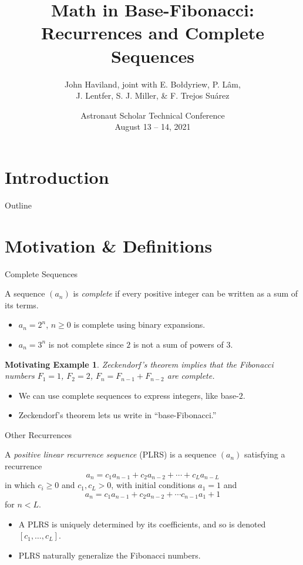 \documentclass[handout]{beamer}
\title[Recurrences and Completeness]{Math in Base-Fibonacci: Recurrences and Complete Sequences}
\author[J. Haviland]{
	John Haviland, joint with
	E. Bo\l dyriew,
	P. L\^am,\\
	J. Lentfer,
	S. J. Miller,
	\& F. Trejos Su\'arez
}
\institute[2021]{SMALL REU 2020, Williams College}
\date{
	Astronaut Scholar Technical Conference\\
	August 13 -- 14, 2021
}
\theoremstyle{example}
\newtheorem{motivexa}{Motivating Example}
\begin{document}
\section{Introduction}
\begin{frame}
	\titlepage
\end{frame}

\begin{frame}{Outline}
	\tableofcontents
\end{frame}

\section{Motivation \& Definitions}
\begin{frame}{Complete Sequences}
	\begin{definition}
		A sequence $(a_n)$ is \emph{complete} if every positive integer can be written as a sum of its terms.
	\end{definition}
	
	\pause
	\begin{itemize}\setlength{\itemsep}{1.5ex}
		\item $a_n = 2^n$, $n \geq 0$ is complete using binary expansions.
		\item $a_n = 3^n$ is not complete since $2$ is not a sum of powers of $3$.
	\end{itemize}
	
	\pause
	\begin{motivexa}
		\emph{Zeckendorf's theorem} implies that the Fibonacci numbers $F_1 = 1$, $F_2 = 2$, $F_n = F_{n - 1} + F_{n - 2}$ are complete.
	\end{motivexa}
	
	\pause
	\begin{itemize}\setlength{\itemsep}{1.5ex}
		\item We can use complete sequences to express integers, like base-$2$.
		\item Zeckendorf's theorem lets us write in ``base-Fibonacci.''
	\end{itemize}
\end{frame}

\begin{frame}{Other Recurrences}
	\begin{definition}
		A \emph{positive linear recurrence sequence} (PLRS) is a sequence $(a_n)$ satisfying a recurrence
		\[
		a_n = c_1 a_{n - 1} + c_2 a_{n - 2} + \cdots + c_L a_{n - L}
		\]
		in which $c_i \geq 0$ and $c_1, c_L > 0$\pause, with initial conditions $a_1 = 1$ and
		\[
		a_n = c_1 a_{n - 1} + c_2 a_{n - 2} + \cdots c_{n - 1} a_1 + 1
		\]
		for $n < L$.
	\end{definition}
	
	\pause
	\begin{itemize}\setlength{\itemsep}{1.5ex}
		\item A PLRS is uniquely determined by its coefficients, and so is denoted $[c_1, \ldots, c_L]$.
		\item PLRS naturally generalize the Fibonacci numbers.
	\end{itemize}
\end{frame}
\end{document}
